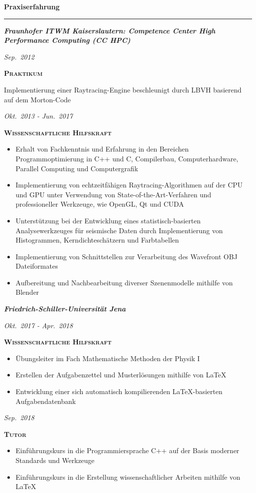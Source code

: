 \documentclass[8pt]{article}
\newcommand{\cvSectionStyle}{%
  \normalfont%
  \Large%
  \color{cvColor}%
  \bfseries%
  \sffamily%
}
\newcommand{\cvSubsectionStyle}{%
  \normalfont%
  \sffamily%
  \itshape%
  \bfseries%
  \color{cvSubsectionColor}%
}
\newcommand{\cvTimeStyle}{%
  \normalfont%
  \sffamily%
  \footnotesize%
  \itshape%
}
\newcommand{\cvQuote}[1]{\guillemotright{}#1\guillemotleft}
\newcommand{\cvSection}[1]{%
  \smallskip%
  {%
    \cvSectionStyle #1%
  }\\[-0.5em]
  \rule{\linewidth}{0.8pt}%
  \par%
  \smallskip%
}
\newcommand{\cvSubsection}[1]{%
  \begin{tcolorbox}[left=0pt, top=0pt, bottom=0pt, right=0pt, boxsep=5pt, arc=5pt, frame code={}, colback=cvBackgroundColor]
    \cvSubsectionStyle #1%
  \end{tcolorbox}
}
\newenvironment{cvItemize}{%
  \begin{itemize}[itemsep=0mm, leftmargin=4mm]
}{%
  \end{itemize}
}
\newenvironment{cvTimeItem}[2]{
  \par
  \begin{minipage}[c]{0.15\linewidth}
    \raggedleft
    \cvTimeStyle #1
  \end{minipage}
  \quad
  \vrule
  \quad
  \begin{minipage}[t]{0.79\linewidth}
    \sffamily\textsc{\color{cvColor} \textbf{#2}}\par
    \normalfont\footnotesize\sffamily\color{cvContentColor}
}{
  \end{minipage}
  \par%
  \vspace{\baselineskip}%
}
\begin{document}
  \cvSection{Praxiserfahrung}
    \cvSubsection{Fraunhofer ITWM Kaiserslautern: Competence Center High Performance Computing (CC HPC)}
      \begin{cvTimeItem}{Sep.~2012}{Praktikum}
        Implementierung einer Raytracing-Engine beschleunigt durch LBVH basierend auf dem Morton-Code
      \end{cvTimeItem}
      \begin{cvTimeItem}{Okt.~2013 - Jun.~2017}{Wissenschaftliche Hilfskraft}
        \begin{cvItemize}
          \item Erhalt von Fachkenntnis und Erfahrung in den Bereichen \cvQuote{Programmoptimierung in C++ und C}, \cvQuote{Compilerbau}, \cvQuote{Computerhardware}, \cvQuote{Parallel Computing} und \cvQuote{Computergrafik}
          \item Implementierung von echtzeitfähigen Raytracing-Algorithmen auf der CPU und GPU unter Verwendung von State-of-the-Art-Verfahren und professioneller Werkzeuge, wie OpenGL, Qt und CUDA
          \item Unterstützung bei der Entwicklung eines statistisch-basierten Analysewerkzeuges für seismische Daten durch Implementierung von Histogrammen, Kerndichteschätzern und Farbtabellen
          \item Implementierung von Schnittstellen zur Verarbeitung des \cvQuote{Wavefront OBJ} Dateiformates
          \item Aufbereitung und Nachbearbeitung diverser Szenenmodelle mithilfe von Blender
        \end{cvItemize}
      \end{cvTimeItem}

    \cvSubsection{Friedrich-Schiller-Universität Jena}
      \begin{cvTimeItem}{Okt.~2017 - Apr.~2018}{Wissenschaftliche Hilfskraft}
        \begin{cvItemize}
          \item Übungsleiter im Fach \cvQuote{Mathematische Methoden der Physik I}
          \item Erstellen der Aufgabenzettel und Musterlösungen mithilfe von LaTeX
          \item Entwicklung einer sich automatisch kompilierenden LaTeX-basierten Aufgabendatenbank
        \end{cvItemize}
      \end{cvTimeItem}
      \begin{cvTimeItem}{Sep.~2018}{Tutor}
        \begin{cvItemize}
          \item Einführungskurs in die Programmiersprache C++ auf der Basis moderner Standards und Werkzeuge
          \item Einführungskurs in die Erstellung wissenschaftlicher Arbeiten mithilfe von LaTeX
        \end{cvItemize}
      \end{cvTimeItem}
\end{document}
